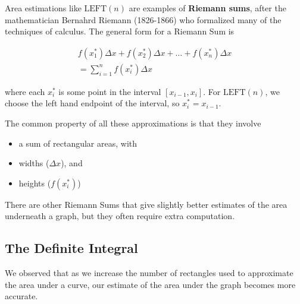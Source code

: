 Area estimations like $\mbox{LEFT}(n)$ are examples of {\bf Riemann sums},
after the mathematician Bernahrd Riemann (1826-1866) who formalized
many of the techniques of calculus.  The general form for a Riemann
Sum is

\begin{align*}
 f(x_{1}^{*}) \Delta x+ f(x_{2}^{*}) \Delta x + \ldots + f(x_{n}^{*}) \Delta x 
 \\ = \displaystyle\sum_{i=1}^{n} f(x_{i}^{*})\Delta x
\end{align*}

where each $x_{i}^{*}$ is some point in the interval $[x_{i-1},
x_{i}]$.  For $\mbox{LEFT}(n)$, we choose the left hand endpoint of the
interval, so $x_{i}^* = x_{i-1}$.

\newpage

The common property of all these
approximations is that they involve
\begin{itemize}
\item a sum of rectangular areas, with \\[1ex]
\item widths ($\Delta x$), and \\[1ex]
\item heights ($f(x_i^*)$)
\end{itemize}

There are other Riemann Sums that give slightly better estimates of
the area underneath a graph, but they often require extra computation.

\newpage

\subsection*{The Definite Integral}

We observed that as we increase the number of rectangles used to
approximate the area under a curve, our estimate of the area under the
graph becomes more accurate.

